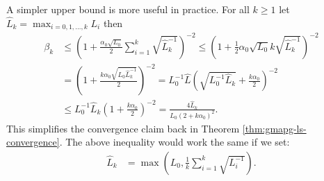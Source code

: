 \documentclass[12pt]{report}
\begin{document}
        \begin{remark}
            A simpler upper bound is more useful in practice. 
            For all $k \ge 1$ let $\hat L_k = \max_{i = 0, 1, \ldots, k} L_i$ then 
            \begin{align*}
                \beta_k 
                &\le \left(
                    1 + 
                    \frac{\alpha_0 \sqrt{L_0}}{2}\sum_{i = 1}^{k}\sqrt{\hat L^{-1}_k}
                \right)^{-2}
                \le \left(
                    1 + \frac{1}{2}\alpha_0 \sqrt{L_0}k\sqrt{\hat L^{-1}_k}
                \right)^{-2}
                \\
                &= \left(
                    1 + \frac{k\alpha_0\sqrt{L_0 \hat L^{-1}_k}}{2}
                \right)^{-2} = L^{-1}_0\hat L\left(
                    \sqrt{L_0^{-1}\hat L_k} + \frac{k\alpha_0}{2}
                \right)^{-2}
                \\
                &\le 
                L^{-1}_0\hat L_k\left(
                    1 + \frac{k\alpha_0}{2}
                \right)^{-2} 
                = \frac{4\hat L_k}{L_0(2 + k \alpha_0)^2}. 
            \end{align*}
            This simplifies the convergence claim back in Theorem \ref{thm:gmapg-ls-convergence}. 
            The above inequality would work the same if we set: 
            \begin{align*}
                \hat L_k &= \max\left(
                    L_0, \frac{1}{k} \sum_{i = 1}^{k} \sqrt{L_i^{-1}}
                \right). 
            \end{align*}
        \end{remark}
\end{document}

